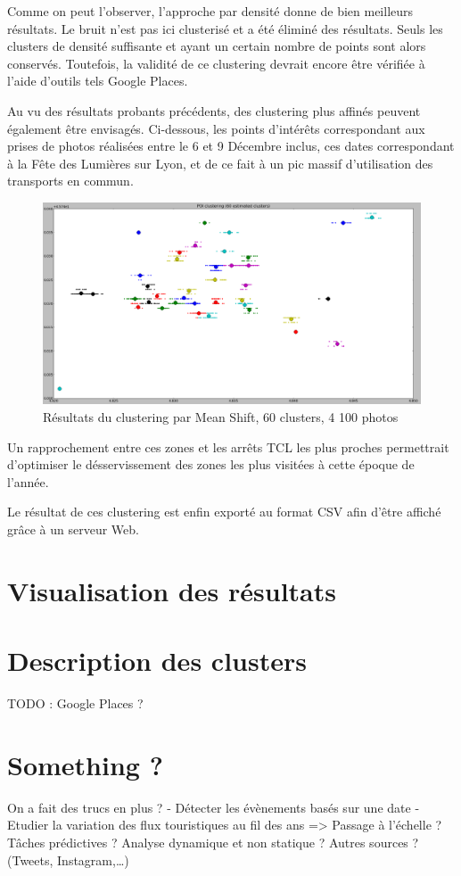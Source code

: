 Comme on peut l'observer, l'approche par densité donne de bien meilleurs résultats. Le bruit n'est pas ici clusterisé et a été éliminé des résultats. Seuls les clusters de densité suffisante et ayant un certain nombre de points sont alors conservés. Toutefois, la validité de ce clustering devrait encore être vérifiée à l'aide d'outils tels Google Places.


Au vu des résultats probants précédents, des clustering plus affinés peuvent également être envisagés. Ci-dessous, les points d'intérêts correspondant aux prises de photos réalisées entre le 6 et 9 Décembre inclus, ces dates correspondant à la Fête des Lumières sur Lyon, et de ce fait à un pic massif d'utilisation des transports en commun.
\begin{figure}[H]
    \centering
    \includegraphics[width=\linewidth]{img/meanshift_lumieres.png}
    \caption{Résultats du clustering par Mean Shift, 60 clusters, 4 100 photos}
\end{figure}

Un rapprochement entre ces zones et les arrêts TCL les plus proches permettrait d'optimiser le désservissement des zones les plus visitées à cette époque de l'année.

Le résultat de ces clustering est enfin exporté au format CSV afin d'être affiché grâce à un serveur Web.
\pagebreak



\section{Visualisation des résultats}

\pagebreak


\section{Description des clusters}
TODO : Google Places ?
\pagebreak


\section{Something ?}
On a fait des trucs en plus ?
- Détecter les évènements basés sur une date
- Etudier la variation des flux touristiques au fil des ans
=> Passage à l’échelle ? Tâches prédictives ? Analyse dynamique et non statique ? Autres sources ? (Tweets, Instagram,…)
\pagebreak
